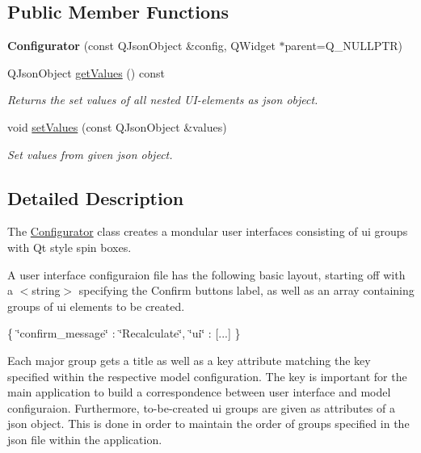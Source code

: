 \subsection*{Public Member Functions}
\begin{DoxyCompactItemize}
\item 
\mbox{\label{class_configurator_a7908b0494f0e057fc0b91c334d5902f9}} 
{\bfseries Configurator} (const Q\+Json\+Object \&config, Q\+Widget $\ast$parent=Q\+\_\+\+N\+U\+L\+L\+P\+TR)
\item 
Q\+Json\+Object \mbox{\hyperlink{class_configurator_a89fc398da91616473846cfcadd511c81}{get\+Values}} () const
\begin{DoxyCompactList}\small\item\em Returns the set values of all nested U\+I-\/elements as json object. \end{DoxyCompactList}\item 
void \mbox{\hyperlink{class_configurator_abb86d4cefc42b8e79fc440e2b13dd9d8}{set\+Values}} (const Q\+Json\+Object \&values)
\begin{DoxyCompactList}\small\item\em Set values from given json object. \end{DoxyCompactList}\end{DoxyCompactItemize}


\subsection{Detailed Description}
The \mbox{\hyperlink{class_configurator}{Configurator}} class creates a mondular user interfaces consisting of ui groups with Qt style spin boxes. 

A user interface configuraion file has the following basic layout, starting off with a $<$string$>$ specifying the Confirm buttons label, as well as an array containing groups of ui elements to be created.

\{ \char`\"{}confirm\+\_\+message\char`\"{} \+: \char`\"{}\+Recalculate\char`\"{}, \char`\"{}ui\char`\"{} \+: \mbox{[}...\mbox{]} \}

Each major group gets a title as well as a key attribute matching the key specified within the respective model configuration. The key is important for the main application to build a correspondence between user interface and model configuraion. Furthermore, to-\/be-\/created ui groups are given as attributes of a json object. This is done in order to maintain the order of groups specified in the json file within the application.

